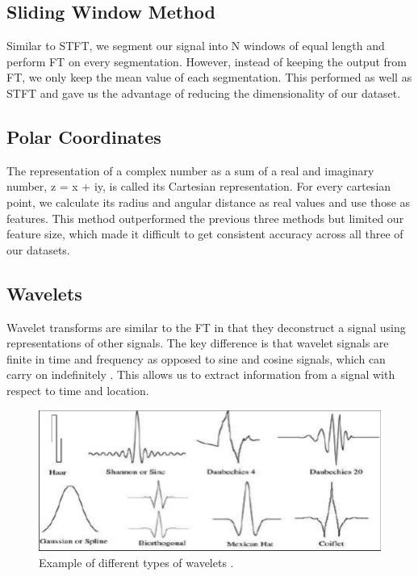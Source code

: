 \documentclass{turabian-thesis}
\begin{document}
\subsection{Sliding Window Method}

Similar to STFT, we segment our signal into N windows of equal length and perform FT on every segmentation. However, instead of keeping the output from FT, we only keep the mean value of each segmentation. This performed as well as STFT and gave us the advantage of reducing the dimensionality of our dataset. 

\subsection{Polar Coordinates}

The representation of a complex number as a sum of a real and imaginary number, z = x + iy, is called its Cartesian representation. For every cartesian point, we calculate its radius and angular distance as real values and use those as features. This method outperformed the previous three methods but limited our feature size, which made it difficult to get consistent accuracy across all three of our datasets.

\subsection{Wavelets}

Wavelet transforms are similar to the FT in that they deconstruct a signal using representations of other signals. The key difference is that wavelet signals are finite in time and frequency as opposed to sine and cosine signals, which can carry on indefinitely \cite{strang_wavelets_1996}. This allows us to extract information from a signal with respect to time and location.


\begin{figure}[h!]
   \begin{center}
      \includegraphics[scale=0.4]{../media/wavelet_families.png}
   \end{center}
   \caption{Example of different types of wavelets  \cite{strang_wavelets_1996}.}
   \label{fig:reinforcementAgent}
\end{figure}
\end{document}
